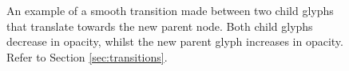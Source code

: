 \begin{figure}
\centering
\caption{An example of a smooth transition made between two child glyphs that translate towards the new parent node. Both child glyphs decrease in opacity, whilst the new parent glyph increases in opacity. Refer to Section \ref{sec:transitions}.} \label{fig:transitions}
\end{figure}

